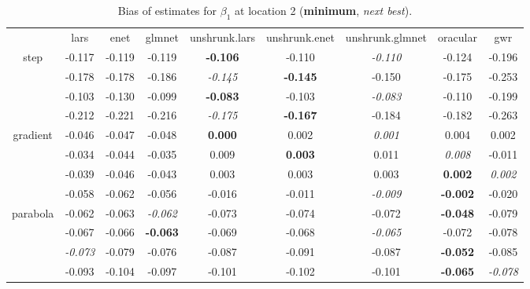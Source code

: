 \documentclass[authoryear, review, 11pt]{elsarticle}
\begin{document}
\begin{table}[ht]
\begin{center}
\begin{tabular}{ccccccccc}
  & lars & enet & glmnet & unshrunk.lars & unshrunk.enet & unshrunk.glmnet & oracular & gwr \\ 
  \cline{2-9}
  \multirow{4}{*}{step} & -0.117 & -0.119 & -0.119 & \textbf{-0.106} & -0.110 & \emph{-0.110} & -0.124 & -0.196 \\ 
  & -0.178 & -0.178 & -0.186 & \emph{-0.145} & \textbf{-0.145} & -0.150 & -0.175 & -0.253 \\ 
  & -0.103 & -0.130 & -0.099 & \textbf{-0.083} & -0.103 & \emph{-0.083} & -0.110 & -0.199 \\ 
  & -0.212 & -0.221 & -0.216 & \emph{-0.175} & \textbf{-0.167} & -0.184 & -0.182 & -0.263 \\ 
  \cline{2-9}
  \multirow{4}{*}{gradient} & -0.046 & -0.047 & -0.048 & \textbf{0.000} & 0.002 & \emph{0.001} & 0.004 & 0.002 \\ 
  & -0.034 & -0.044 & -0.035 & 0.009 & \textbf{0.003} & 0.011 & \emph{0.008} & -0.011 \\ 
  & -0.039 & -0.046 & -0.043 & 0.003 & 0.003 & 0.003 & \textbf{0.002} & \emph{0.002} \\ 
  & -0.058 & -0.062 & -0.056 & -0.016 & -0.011 & \emph{-0.009} & \textbf{-0.002} & -0.020 \\ 
  \cline{2-9}
  \multirow{4}{*}{parabola} & -0.062 & -0.063 & \emph{-0.062} & -0.073 & -0.074 & -0.072 & \textbf{-0.048} & -0.079 \\ 
  & -0.067 & -0.066 & \textbf{-0.063} & -0.069 & -0.068 & \emph{-0.065} & -0.072 & -0.078 \\ 
  & \emph{-0.073} & -0.079 & -0.076 & -0.087 & -0.091 & -0.087 & \textbf{-0.052} & -0.085 \\ 
  & -0.093 & -0.104 & -0.097 & -0.101 & -0.102 & -0.101 & \textbf{-0.065} & \emph{-0.078} \\ 
  \end{tabular}
\caption{Bias of estimates for $\beta_1$ at location 2 (\textbf{minimum}, \emph{next best}).\label{table:loc2-X1-BiasX}}
\end{center}
\end{table}
\end{document}
